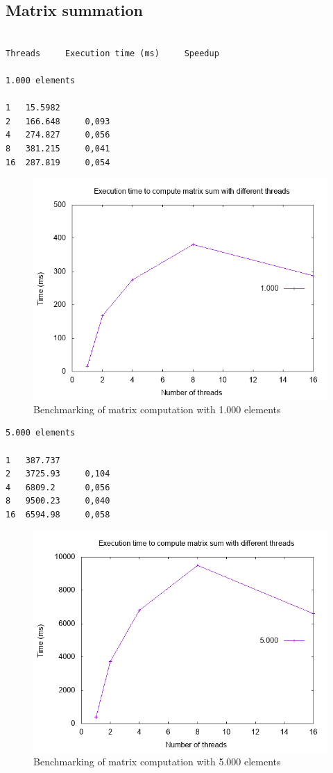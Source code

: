 \documentclass{article}
\begin{document}
\subsection{Matrix summation}
\begin{verbatim}

Threads     Execution time (ms)     Speedup

1.000 elements 

1   15.5982 	 	     
2   166.648     0,093       
4   274.827     0,056
8   381.215     0,041
16  287.819     0,054
\end{verbatim}
\begin{figure}[h]
\centering
\includegraphics[scale=0.5]{Matrix - 1k.png}
\caption{Benchmarking of matrix computation with 1.000 elements}
\end{figure}      

\clearpage

\begin{verbatim}
5.000 elements

1   387.737	   
2   3725.93     0,104
4   6809.2      0,056    
8   9500.23     0,040   
16  6594.98     0,058   
\end{verbatim}

\begin{figure}[h]
\centering
\includegraphics[scale=0.5]{5k.png}
\caption{Benchmarking of matrix computation with 5.000 elements}
\end{figure}      
\clearpage
\end{document}
